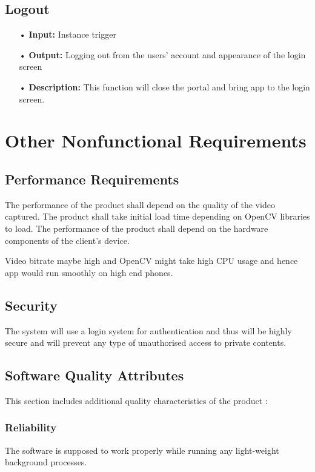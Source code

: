 \documentclass{scrreprt}
\begin{document}
\section{Logout}
\begin{enumerate}
\item[•]  \textbf{Input:}
Instance trigger
\item[•]  \textbf{Output:}
Logging out from the users' account and appearance of the login screen
\item[•]  \textbf{Description:}
This function will close the portal and bring app to the login screen.
\end{enumerate}

\chapter{Other Nonfunctional Requirements}

\section{Performance Requirements}
The performance of the product shall depend on the quality of the video captured.
The product shall take initial load time depending on OpenCV libraries to load.
The performance of the product shall depend on the hardware components of the client’s device.

Video bitrate maybe high and OpenCV might take high CPU usage and hence app would run smoothly on high end phones.

\section{Security}
The system will use a login system for authentication and thus will be highly secure and will prevent any type of unauthorised access to private contents.  

\section{Software Quality Attributes}
This section includes additional quality characteristics of the product :


\subsection{Reliability}
The software is supposed to work properly while running any light-weight background processes.
\end{document}
